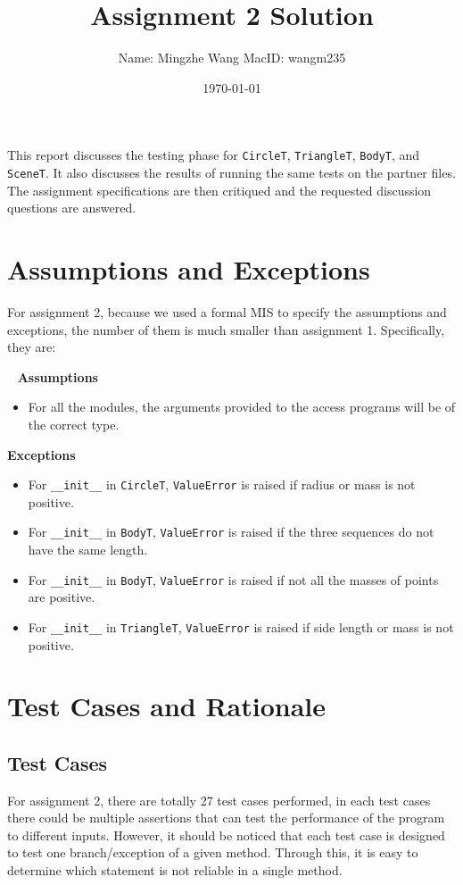 \documentclass[12pt]{article}
\title{Assignment 2 Solution}
\author{Name: Mingzhe Wang MacID: wangm235}
\date{\today}
\begin{document}
\maketitle

This report discusses the testing phase for \verb|CircleT|, \verb|TriangleT|, \verb|BodyT|, and  \verb|SceneT|. It also discusses the results
of running the same tests on the partner files. The assignment specifications
are then critiqued and the requested discussion questions are answered.

\section{Assumptions and Exceptions} \label{AssumptAndExcept}
For assignment 2, because we used a formal MIS to specify the assumptions and exceptions, the number of them is much smaller than assignment 1. Specifically, they are:

~\newline\noindent
\textbf{Assumptions}
\begin{itemize} 
\item For all the modules, the arguments provided to the access programs will be of the correct type.
\end{itemize}
\textbf{Exceptions}
\begin{itemize}
\item For \verb|__init__| in \verb|CircleT|, \verb|ValueError| is raised if radius or mass is not positive.
\item For \verb|__init__| in \verb|BodyT|, \verb|ValueError| is raised  if the three sequences do not have the same length. 
\item For \verb|__init__| in \verb|BodyT|, \verb|ValueError| is raised  if not all the masses of points are positive.
\item For \verb|__init__| in \verb|TriangleT|, \verb|ValueError| is raised if side length or mass is not positive.

\end{itemize}

\section{Test Cases and Rationale} \label{Testing}
\subsection{Test Cases}
For assignment 2, there are totally 27 test cases performed, in each test cases there could be multiple assertions that can test the performance of the program to different inputs. However, it should be noticed that each test case is designed to test one branch/exception of a given method. Through this, it is easy to determine which statement is not reliable in a single method.
\end{document}
